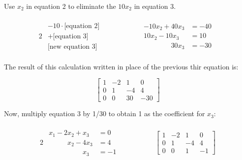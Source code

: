 \documentclass{article}
\begin{document}
\noindent Use $x_2$ in equation 2 to eliminate the $10x_2$ in equation 3.

\begin{alignat*}{2}
    \begin{matrix} 
        \begin{split}
            -10\cdot\text{[equation 2]}\\
            +\text{[equation 3]}\\
            \hline
            \text{[new equation 3]}
        \end{split}
    \end{matrix}
    & \hspace{ 4em}%
    \begin{matrix} 
        \begin{split}
            -10x_2 + 40x_3 &= -40\\
            10x_2 - 10x_3 &= 10\\
            \hline
            \phantom{-10x_2+}30x_3 &= -30
        \end{split}
    \end{matrix}
\end{alignat*}

\noindent  The result of this calculation written in place of the previous thir equation is:

\begin{equation*}
    \begin{bmatrix}
        1 & -2 & 1 & 0\\
        0 & 1 & -4 & 4\\
        0 & 0 & 30 & -30
    \end{bmatrix}
\end{equation*}

\noindent Now, multiply equation 3 by 1/30 to obtain 1 as the coefficient for $x_3$:

\begin{alignat*}{2}
    \begin{matrix} 
        \begin{split}
            x_1 - 2x_2 + x_3 &= 0\\
            \phantom{x_1-2} x_2 - 4x_3 &= 4\\
            \hline
            \phantom{ x_1 - 2x_2 +} x_3 &= -1
        \end{split}
    \end{matrix}
    & \hspace{ 4em}%
    \begin{bmatrix}
        1 & -2 & 1 & 0\\
        0 & 1 & -4 & 4\\
        0 & 0 & 1 & -1
    \end{bmatrix}
\end{alignat*}
\end{document}
